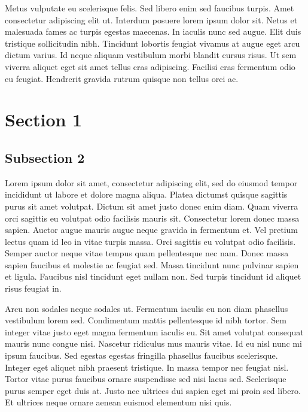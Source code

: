 \documentclass[portuguese, 11pt, a4paper,titlepage, oneside]{article}
\begin{document}
Metus vulputate eu scelerisque felis. Sed libero enim sed faucibus turpis. Amet consectetur adipiscing elit ut. Interdum posuere lorem ipsum dolor sit. Netus et malesuada fames ac turpis egestas maecenas. In iaculis nunc sed augue. Elit duis tristique sollicitudin nibh. Tincidunt lobortis feugiat vivamus at augue eget arcu dictum varius. Id neque aliquam vestibulum morbi blandit cursus risus. Ut sem viverra aliquet eget sit amet tellus cras adipiscing. Facilisi cras fermentum odio eu feugiat. Hendrerit gravida rutrum quisque non tellus orci ac.

\pagebreak
\section{Section 1}
\subsection{Subsection 2}
Lorem ipsum dolor sit amet, consectetur adipiscing elit, sed do eiusmod tempor incididunt ut labore et dolore magna aliqua. Platea dictumst quisque sagittis purus sit amet volutpat. Dictum sit amet justo donec enim diam. Quam viverra orci sagittis eu volutpat odio facilisis mauris sit. Consectetur lorem donec massa sapien. Auctor augue mauris augue neque gravida in fermentum et. Vel pretium lectus quam id leo in vitae turpis massa. Orci sagittis eu volutpat odio facilisis. Semper auctor neque vitae tempus quam pellentesque nec nam. Donec massa sapien faucibus et molestie ac feugiat sed. Massa tincidunt nunc pulvinar sapien et ligula. Faucibus nisl tincidunt eget nullam non. Sed turpis tincidunt id aliquet risus feugiat in.

Arcu non sodales neque sodales ut. Fermentum iaculis eu non diam phasellus vestibulum lorem sed. Condimentum mattis pellentesque id nibh tortor. Sem integer vitae justo eget magna fermentum iaculis eu. Sit amet volutpat consequat mauris nunc congue nisi. Nascetur ridiculus mus mauris vitae. Id eu nisl nunc mi ipsum faucibus. Sed egestas egestas fringilla phasellus faucibus scelerisque. Integer eget aliquet nibh praesent tristique. In massa tempor nec feugiat nisl. Tortor vitae purus faucibus ornare suspendisse sed nisi lacus sed. Scelerisque purus semper eget duis at. Justo nec ultrices dui sapien eget mi proin sed libero. Et ultrices neque ornare aenean euismod elementum nisi quis.
\end{document}
